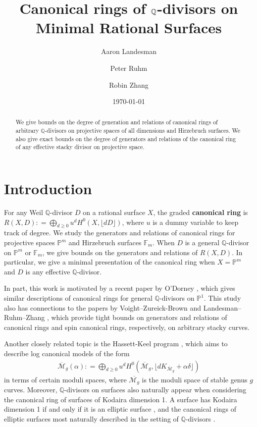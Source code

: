 \documentclass{amsart}
\title{Canonical rings of $\bq$-divisors on Minimal Rational Surfaces}
\author{Aaron Landesman}
\author{Peter Ruhm}
\author{Robin Zhang}
\date{\today}
\theoremstyle{plain}
\theoremstyle{definition}
\theoremstyle{remark}
\numberwithin{equation}{section}
\newcommand\bq{{\mathbb Q}}
\newcommand\bp{{\mathbb P}}
\newcommand\bk{{\Bbbk}}
\newcommand\hirz{\mathbb{F}}
\begin{document}
\begin{abstract}
 	We give bounds on the degree of generation and relations of
	canonical rings of arbitrary $\bq$-divisors
	on projective spaces of all dimensions
	and Hirzebruch surfaces. We also give
	exact bounds on the degree of generators and relations of the canonical
	ring of any effective stacky divisor on projective space.
\end{abstract}

\maketitle
{}
\todo{Aaron: Make sure to use $\bk$ instead of $k$ for the field}

\section{Introduction}
\label{sec:intro}
For any Weil $\bq$-divisor $D$ on a rational surface $X$, the graded
\textbf{canonical ring} is $R(X, D) \colon = \bigoplus_{d \geq 0} u^d H^0(X, \lfloor dD \rfloor)$, where $u$ is a dummy variable to keep
track of degree.
We study the generators and relations of canonical
rings for projective spaces $\bp^m$ and Hirzebruch surfaces $\hirz_m$.
When $D$ is a general $\bq$-divisor on $\bp^m$ or
$\hirz_m$, we give bounds on the generators and relations of
$R(X, D)$. In particular, we give a minimal presentation of the
canonical ring when $X = \bp^m$ and $D$ is any effective
$\bq$-divisor.  

In part, this work is motivated by a recent paper by
O'Dorney \cite{dorney:canonical}, which gives similar descriptions
of canonical rings for general $\bq$-divisors on $\bp^1$. This
study also has connections to the papers by Voight--Zureick-Brown 
\cite{vzb:stacky} and Landesman--Ruhm--Zhang \cite{lrz:spin-cring},
which provide tight bounds on generators and relations
of canonical rings and spin canonical rings, respectively, on arbitrary stacky curves.

Another closely related topic is the Hassett-Keel program \cite{hassett:classical-and-minimal-models}, which aims to describe log canonical models of the form 
\begin{align*}
	\overline {\mathscr M}_g(\alpha) \colon = \bigoplus_{d \geq 0} u^d H^0 \left(
	\overline {\mathscr M}_g, \lfloor d K_{\overline{\mathscr M}_g} +
	\alpha\delta \rfloor  \right) 
\end{align*}
in terms of certain moduli spaces, where $\overline {\mathscr M_g}$ is the
moduli space of stable genus $g$ curves.
Moreover, $\bq$-divisors on surfaces also naturally
appear when considering the canonical ring of surfaces of Kodaira dimension 1.
A surface has Kodaira dimension 1 if and only if it is an elliptic surface \cite[p. 244]{
barthHPV:compactComplexSurfaces}, and
the canonical rings of elliptic surfaces most naturally described in the setting of
$\bq$-divisors \cite[Chapter V, Theorem 12.1]{barthHPV:compactComplexSurfaces}. 
\end{document}
